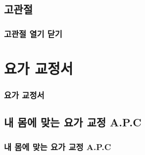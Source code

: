 \documentclass[12pt, a4paper, oneside]{book}
\let\stdsection\section
\renewcommand\section{\newpage\stdsection}
\begin{document}
	\chapter{고관절}
	\newpage
	\minitoc

	\section{고관절 열기 닫기} 








	\part{요가 교정서}
	\noptcrule
	\parttoc				

	\section{요가 교정서}



	\chapter{내 몸에 맞는 요가 교정 A.P.C}
	\minitoc%

	\section{내 몸에 맞는 요가 교정 A.P.C}

\end{document}
